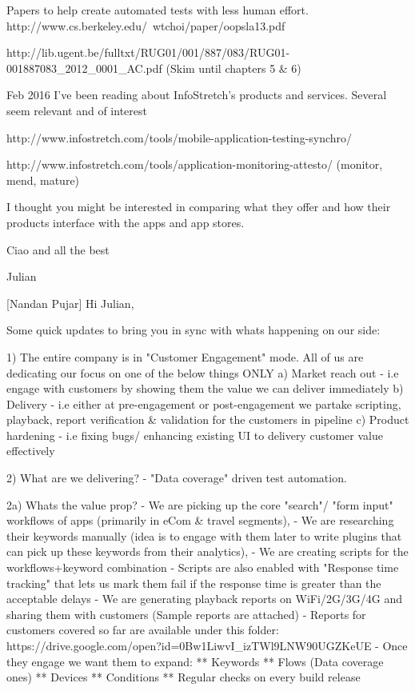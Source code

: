 

Papers to help create automated tests with less human effort.
http://www.cs.berkeley.edu/~wtchoi/paper/oopsla13.pdf 

http://lib.ugent.be/fulltxt/RUG01/001/887/083/RUG01-001887083_2012_0001_AC.pdf (Skim until chapters 5 & 6)

Feb 2016
I've been reading about InfoStretch's products and services. Several seem relevant and of interest

http://www.infostretch.com/tools/mobile-application-testing-synchro/

http://www.infostretch.com/tools/application-monitoring-attesto/ (monitor, mend, mature)

I thought you might be interested in comparing what they offer and how their products interface with the apps and app stores.

Ciao and all the best


Julian

[Nandan Pujar] Hi Julian,

Some quick updates to bring you in sync with whats happening on our side:

1) The entire company is in "Customer Engagement" mode. All of us are dedicating our focus on one of the below things ONLY
a) Market reach out - i.e engage with customers by showing them the value we can deliver immediately
b) Delivery - i.e either at pre-engagement or post-engagement we partake scripting, playback, report verification & validation for the customers in pipeline
c) Product hardening - i.e fixing bugs/ enhancing existing UI to delivery customer value effectively

2) What are we delivering? - 
"Data coverage" driven test automation. 

2a) Whats the value prop?
- We are picking up the core "search"/ "form input" workflows of apps (primarily in eCom & travel segments), 
- We are researching their keywords manually (idea is to engage with them later to write plugins that can pick up these keywords from their analytics), 
- We are creating scripts for the workflows+keyword combination
- Scripts are also enabled with "Response time tracking" that lets us mark them fail if the response time is greater than the acceptable delays
- We are generating playback reports on WiFi/2G/3G/4G and sharing them with customers (Sample reports are attached)
- Reports for customers covered so far are available under this folder:
https://drive.google.com/open?id=0Bw1LiwvI_izTWl9LNW90UGZKeUE
- Once they engage we want them to expand:
** Keywords
** Flows (Data coverage ones)
** Devices
** Conditions
** Regular checks on every build release

